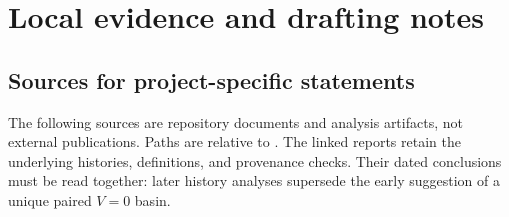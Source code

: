 \documentclass[11pt,letterpaper]{article}
\begin{document}
\appendix
\section{Local evidence and drafting notes}
\label{sec:evidence}

\subsection{Sources for project-specific statements}

The following sources are repository documents and analysis artifacts,
not external publications. Paths are relative to .
The linked reports retain the underlying histories, definitions, and
provenance checks. Their dated conclusions must be read together: later
history analyses supersede the early suggestion of a unique paired
$V=0$ basin.
\end{document}
